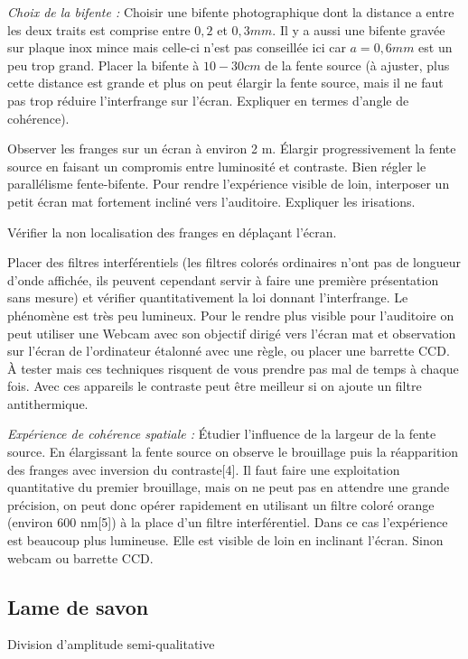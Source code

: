 \documentclass{article}%
\begin{document}
    \textit{Choix de la bifente :}
    Choisir une bifente photographique dont la distance a entre les deux traits est comprise entre $0,2$ et $0,3 mm$. Il y a aussi une bifente gravée sur plaque inox mince mais celle-ci n'est pas conseillée ici car $a = 0,6 mm$ est un peu trop grand. Placer la bifente à $10-30 cm$ de la fente source (à ajuster, plus cette distance est grande et plus on peut élargir la fente source, mais il ne faut pas trop réduire l'interfrange sur l'écran. Expliquer en termes d'angle de cohérence).

    Observer les franges sur un écran à environ 2 m. Élargir progressivement la fente source en faisant un compromis entre luminosité et contraste. Bien régler le parallélisme fente-bifente. Pour rendre l'expérience visible de loin, interposer un petit écran mat fortement incliné vers l'auditoire. Expliquer les irisations.

    Vérifier la non localisation des franges en déplaçant l'écran. 

    Placer des filtres interférentiels (les filtres colorés ordinaires n'ont pas de longueur d'onde affichée, ils peuvent cependant servir à faire une première présentation sans mesure) et vérifier quantitativement la loi donnant l'interfrange. Le phénomène est très peu lumineux. Pour le rendre plus visible pour l'auditoire on peut utiliser une Webcam avec son objectif dirigé vers l'écran mat et observation sur l'écran de l'ordinateur étalonné avec une règle, ou placer une barrette CCD. À tester mais ces techniques risquent de vous prendre pas mal de temps à chaque fois. Avec ces appareils le contraste peut être meilleur si on ajoute un filtre antithermique.

    \textit{Expérience de cohérence spatiale :} Étudier l'influence de la largeur de la fente source. En élargissant la fente source on observe le brouillage puis la réapparition des franges avec inversion du contraste[4]. Il faut faire une exploitation quantitative du premier brouillage, mais on ne peut pas en attendre une grande précision, on peut donc opérer rapidement en utilisant un filtre coloré orange (environ 600 nm[5]) à la place d'un filtre interférentiel. Dans ce cas l'expérience est beaucoup plus lumineuse. Elle est visible de loin en inclinant l'écran. Sinon webcam ou barrette CCD.

\subsection{Lame de savon}
Division d'amplitude
semi-qualitative
\end{document}

